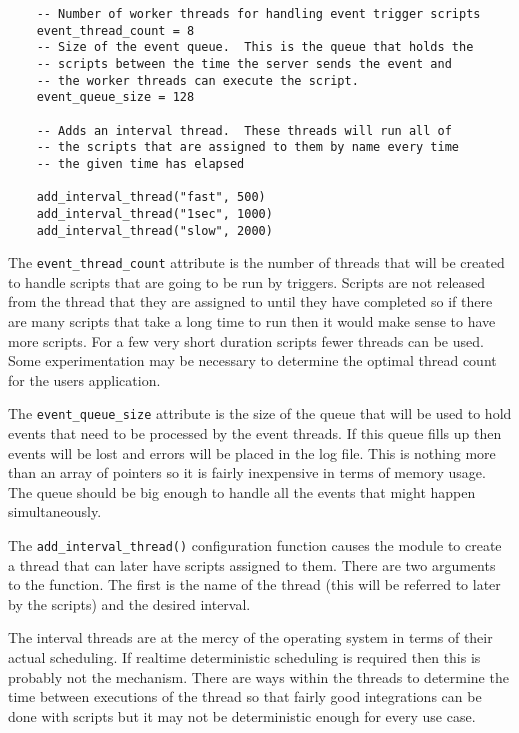 \begin{verbatim}
	-- Number of worker threads for handling event trigger scripts
	event_thread_count = 8
	-- Size of the event queue.  This is the queue that holds the
    -- scripts between the time the server sends the event and
    -- the worker threads can execute the script.
	event_queue_size = 128

	-- Adds an interval thread.  These threads will run all of
	-- the scripts that are assigned to them by name every time
	-- the given time has elapsed

	add_interval_thread("fast", 500)
	add_interval_thread("1sec", 1000)
	add_interval_thread("slow", 2000)

\end{verbatim}

The \texttt{event\_thread\_count} attribute is the number of threads that will be created to handle
scripts that are going to be run by triggers.  Scripts are not released from the thread that
they are assigned to until they have completed so if there are many scripts that take a long
time to run then it would make sense to have more scripts.  For a few very short duration scripts
fewer threads can be used.  Some experimentation may be necessary to determine the optimal thread
count for the users application.

The \texttt{event\_queue\_size} attribute is the size of the queue that will be used to hold events that
need to be processed by the event threads.  If this queue fills up then events will be lost and
errors will be placed in the log file.  This is nothing more than an array of pointers so it is
fairly inexpensive in terms of memory usage.  The queue should be big enough to handle all the events
that might happen simultaneously.

The \texttt{add\_interval\_thread()} configuration function causes the module to create a thread
that can later have scripts assigned to them.  There are two arguments to the function.  The first
is the name of the thread (this will be referred to later by the scripts) and the desired interval.

The interval threads are at the mercy of the operating system in terms of their actual scheduling.
If realtime deterministic scheduling is required then this is probably not the mechanism.  There
are ways within the threads to determine the time between executions of the thread so that fairly good
integrations can be done with scripts but it may not be deterministic enough for every use case.

